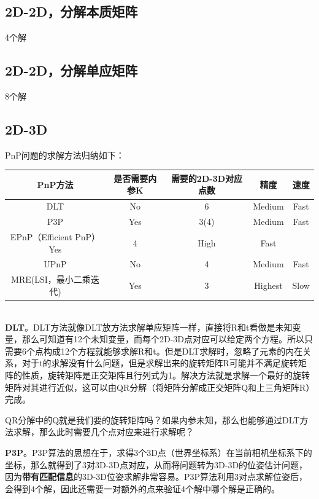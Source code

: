 \subsection{2D-2D，分解本质矩阵}
4个解
\subsection{2D-2D，分解单应矩阵}
8个解



\subsection{2D-3D}

PnP问题的求解方法归纳如下：
~\\ %

\begin{tabular}{|c|c|c|c|c|}
	\hline
	PnP方法 & 是否需要内参K & 需要的2D-3D对应点数 & 精度 & 速度 \\
	\hline
	DLT & No & 6 & Medium & Fast   \\
	P3P& Yes & 3(4)& Medium & Fast \\
	EPnP（Efficient PnP）Yes & 4 & High & Fast   \\
	UPnP & No & 4 & Medium & Fast  \\
	MRE(LSI，最小二乘迭代) & Yes & 3 & Highest & Slow \\
	\hline
\end{tabular}

~\\

\textbf{DLT}。DLT方法就像DLT放方法求解单应矩阵一样，直接将R和t看做是未知变量，那么可知道有12个未知变量，而每个2D-3D点对应可以给定两个方程。所以只需要6个点构成12个方程就能够求解R和t。但是DLT求解时，忽略了元素的内在关系，对于t的求解没有什么问题，但是求解出来的旋转矩阵R可能并不满足旋转矩阵的性质，旋转矩阵是正交矩阵且行列式为1。解决方法就是求解一个最好的旋转矩阵对其进行近似，这可以由QR分解（将矩阵分解成正交矩阵Q和上三角矩阵R）完成。
\begin{note}
	QR分解中的Q就是我们要的旋转矩阵吗？如果内参未知，那么也能够通过DLT方法求解，那么此时需要几个点对应来进行求解呢？
\end{note}


\textbf{P3P}。P3P算法的思想在于，求得3个3D点（世界坐标系）在当前相机坐标系下的坐标，那么就得到了3对3D-3D点对应，从而将问题转为3D-3D的位姿估计问题，因为\textbf{带有匹配信息}的3D-3D位姿求解非常容易。P3P算法利用3对点求解位姿后，会得到4个解，因此还需要一对额外的点来验证4个解中哪个解是正确的。


